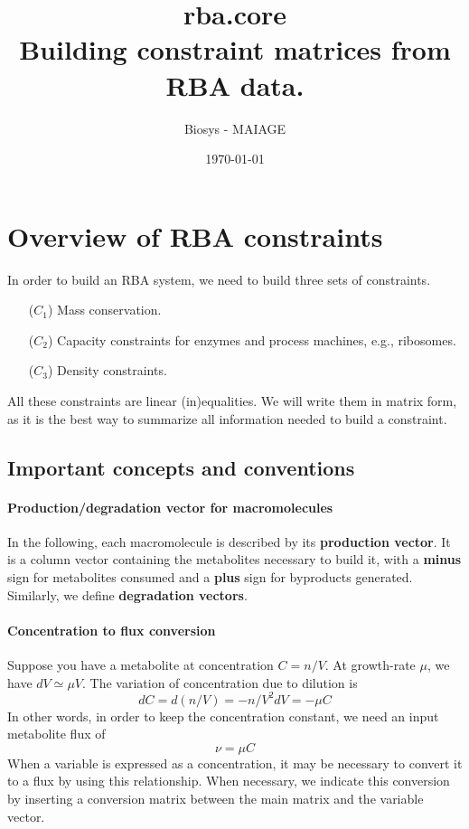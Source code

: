 \documentclass[12pt]{scrartcl}
\theoremstyle{definition}
\theoremstyle{remark}
\numberwithin{equation}{section}
\begin{document}
\title{rba.core\\ Building constraint matrices from RBA data.}%
\author{Biosys - MAIAGE}%
\date{\today}%

\maketitle

\newpage

\tableofcontents

\newpage

\section{Overview of RBA constraints}

In order to build an RBA system, we need to build three sets of constraints.

\begin{itemize}
  \item[($C_1$)] Mass conservation.
  \item[($C_2$)] Capacity constraints for enzymes and process machines, e.g., ribosomes.
  \item[($C_3$)] Density constraints.
\end{itemize}

All these constraints are linear (in)equalities.
We will write them in matrix form, as it is the best way to summarize
all information needed to build a constraint.

\subsection{Important concepts and conventions}

\paragraph{Production/degradation vector for macromolecules}
In the following, each macromolecule is described by its \textbf{production vector}.
It is a column vector containing the metabolites necessary to build it,
with a \textbf{minus} sign for metabolites consumed and a \textbf{plus} sign for byproducts generated.
Similarly, we define \textbf{degradation vectors}.

\paragraph{Concentration to flux conversion}
Suppose you have a metabolite at concentration $C = n/V$.
At growth-rate $\mu$, we have $dV \simeq \mu V$.
The variation of concentration due to dilution is
\[
  dC = d(n/V) = -n/V^2 dV = -\mu C
\]
In other words, in order to keep the concentration constant,
we need an input metabolite flux of
\[
  \nu = \mu C
\]
When a variable is expressed as a concentration, it may be necessary to
convert it to a flux by using this relationship.
When necessary, we indicate this conversion by inserting a conversion
matrix between the main matrix and the variable vector.
\end{document}
